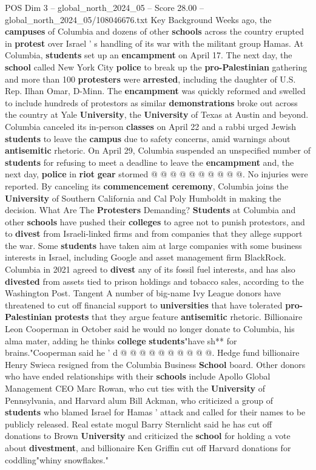 \begin{textsample}{POS Dim 3 – global\_north\_2024\_05 – Score 28.00 – global\_north\_2024\_05/108046676.txt}
Key Background Weeks ago, the \textbf{campuses} of Columbia and dozens of other \textbf{schools} across the country erupted in \textbf{protest} over Israel ' s handling of its war with the militant group Hamas.
At Columbia, \textbf{students} set up an \textbf{encampment} on April 17.
The next day, the \textbf{school} called New York City \textbf{police} to break up the \textbf{pro-Palestinian} gathering and more than 100 \textbf{protesters} were \textbf{arrested}, including the daughter of U.S.
Rep.
Ilhan Omar, D-Minn.
The \textbf{encampment} was quickly reformed and swelled to include hundreds of protestors as similar \textbf{demonstrations} broke out across the country at Yale \textbf{University}, the \textbf{University} of Texas at Austin and beyond.
Columbia canceled its in-person \textbf{classes} on April 22 and a rabbi urged Jewish \textbf{students} to leave the \textbf{campus} due to safety concerns, amid warnings about \textbf{antisemitic} rhetoric.
On April 29, Columbia suspended an unspecified number of \textbf{students} for refusing to meet a deadline to leave the \textbf{encampment} and, the next day, \textbf{police} in \textbf{riot} \textbf{gear} stormed @ @ @ @ @ @ @ @ @ @.
No injuries were reported.
By canceling its \textbf{commencement} \textbf{ceremony}, Columbia joins the \textbf{University} of Southern California and Cal Poly Humboldt in making the decision.
What Are The \textbf{Protesters} Demanding? \textbf{Students} at Columbia and other \textbf{schools} have pushed their \textbf{colleges} to agree not to punish protestors, and to \textbf{divest} from Israeli-linked firms and from companies that they allege support the war.
Some \textbf{students} have taken aim at large companies with some business interests in Israel, including Google and asset management firm BlackRock.
Columbia in 2021 agreed to \textbf{divest} any of its fossil fuel interests, and has also \textbf{divested} from assets tied to prison holdings and tobacco sales, according to the Washington Post.
Tangent A number of big-name Ivy League donors have threatened to cut off financial support to \textbf{universities} that have tolerated \textbf{pro-Palestinian} \textbf{protests} that they argue feature \textbf{antisemitic} rhetoric.
Billionaire Leon Cooperman in October said he would no longer donate to Columbia, his alma mater, adding he thinks \textbf{college} \textbf{students}"have sh** for brains."Cooperman said he ' d @ @ @ @ @ @ @ @ @ @.
Hedge fund billionaire Henry Swieca resigned from the Columbia Business \textbf{School} board.
Other donors who have ended relationships with their \textbf{schools} include Apollo Global Management CEO Marc Rowan, who cut ties with the \textbf{University} of Pennsylvania, and Harvard alum Bill Ackman, who criticized a group of \textbf{students} who blamed Israel for Hamas ' attack and called for their names to be publicly released.
Real estate mogul Barry Sternlicht said he has cut off donations to Brown \textbf{University} and criticized the \textbf{school} for holding a vote about \textbf{divestment}, and billionaire Ken Griffin cut off Harvard donations for coddling"whiny snowflakes."


\end{textsample}
